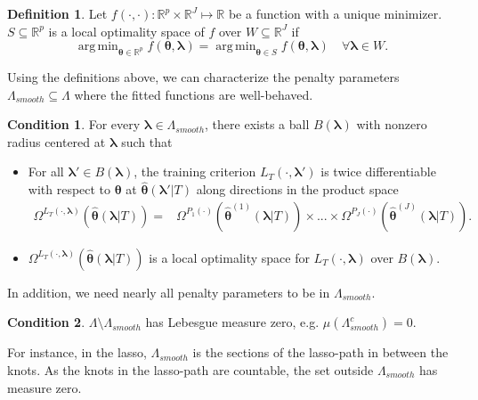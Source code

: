 \documentclass[12pt]{article} %
\theoremstyle{definition}
\newtheorem{definition}{Definition}
\newtheorem{condition}{Condition}
\DeclareMathOperator*{\argmin}{arg\,min}
\begin{document}
\begin{definition}
	Let $f(\cdot, \cdot): \mathbb{R}^p \times \mathbb{R}^J \mapsto \mathbb{R}$ be a function with a unique minimizer.
	$S \subseteq \mathbb{R}^p$ is a local optimality space of $f$ over $W \subseteq \mathbb{R}^J$ if
	\begin{equation}
	\argmin_{\boldsymbol{\theta} \in \mathbb{R}^p} f(\boldsymbol{\theta}, \boldsymbol \lambda) =
	\argmin_{\boldsymbol{\theta} \in S} f(\boldsymbol{\theta}, \boldsymbol \lambda) \quad \forall \boldsymbol \lambda \in W.
	\end{equation}
\end{definition}
\noindent Using the definitions above, we can characterize the penalty parameters $\Lambda_{smooth} \subseteq \Lambda$ where the fitted functions are well-behaved.
\begin{condition}
	\label{condn:nonsmooth1}
	For every $\boldsymbol{\lambda} \in \Lambda_{smooth}$, there exists a ball $B(\boldsymbol{\lambda})$ with nonzero radius centered at $\boldsymbol{\lambda}$ such that
	\begin{itemize}
		\item For all $\boldsymbol{\lambda}'\in B(\boldsymbol{\lambda})$, the training criterion $L_{T}(\cdot, \boldsymbol{\lambda}')$ is twice differentiable with respect to $\boldsymbol{\theta}$ at $\hat{\boldsymbol{\theta}}(\boldsymbol{\lambda}'|T)$
		along directions in the product space
		\begin{align}
		\Omega^{L_T(\cdot, \boldsymbol{\lambda})} \left (\hat{\boldsymbol \theta}\left(\boldsymbol{\lambda}|T \right) \right) =
		& \Omega^{P_1(\cdot)}
			\left(\hat{\boldsymbol{\theta}}^{(1)}(\boldsymbol{\lambda} | T)\right)
		\times
		...
		\times
		\Omega^{P_J(\cdot)}
		\left(\hat{\boldsymbol{\theta}}^{(J)}(\boldsymbol{\lambda} | T)\right)
		.
		\end{align}
		\item $\Omega^{L_T(\cdot, \boldsymbol{\lambda})} \left (\hat{\boldsymbol \theta}\left(\boldsymbol{\lambda}|T \right) \right)$ is a local optimality space for $L_T\left(\cdot,\boldsymbol{\lambda}\right)$ over $B(\boldsymbol{\lambda})$.
	\end{itemize}
\end{condition}
\noindent In addition, we need nearly all penalty parameters to be in $\Lambda_{smooth}$.
\begin{condition}
	\label{condn:nonsmooth2}
	$\Lambda \setminus \Lambda_{smooth}$ has Lebesgue measure zero, e.g. $\mu(\Lambda_{smooth}^c) = 0$.
\end{condition}
\noindent For instance, in the lasso, $\Lambda_{smooth}$ is the sections of the lasso-path in between the knots.
As the knots in the lasso-path are countable, the set outside $\Lambda_{smooth}$ has measure zero.
\end{document}
